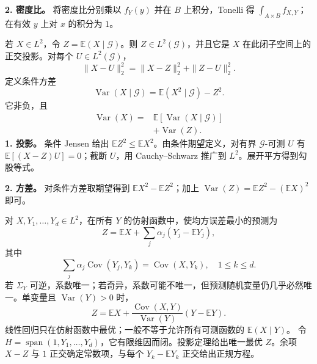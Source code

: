\textbf{2. 密度比。} 将密度比分别乘以 $f_Y(y)$ 并在 $B$ 上积分，Tonelli 得 $\int_{A\times B}f_{X,Y}$；在有效 $y$ 上对 $x$ 的积分为 $1$。

若 $X\in L^2$，令 $Z=\mathbb E(X\mid\mathcal G)$。则 $Z\in L^2(\mathcal G)$，并且它是 $X$ 在此闭子空间上的正交投影。对每个 $U\in L^2(\mathcal G)$，
\[
\|X-U\|_2^2=\|X-Z\|_2^2+\|Z-U\|_2^2.
\]
定义条件方差
\[
\operatorname{Var}(X\mid\mathcal G)
=\mathbb E(X^2\mid\mathcal G)-Z^2.
\]
它非负，且
\[
\begin{aligned}
\operatorname{Var}(X)
={}&\mathbb E[\operatorname{Var}(X\mid\mathcal G)]\\
&+\operatorname{Var}(Z).
\end{aligned}
\]
\textbf{1. 投影。} 条件 Jensen 给出 $\mathbb EZ^2\le\mathbb EX^2$。由条件期望定义，对有界 $\mathcal G$-可测 $U$ 有 $\mathbb E[(X-Z)U]=0$；截断 $U$，用 Cauchy--Schwarz 推广到 $L^2$。展开平方得到勾股等式。

\textbf{2. 方差。} 对条件方差取期望得到 $\mathbb EX^2-\mathbb EZ^2$；加上 $\operatorname{Var}(Z)=\mathbb EZ^2-(\mathbb EX)^2$ 即可。

对 $X,Y_1,\ldots,Y_d\in L^2$，在所有 $Y$ 的仿射函数中，使均方误差最小的预测为
\[
Z=\mathbb EX+\sum_j\alpha_j(Y_j-\mathbb EY_j),
\]
其中
\[
\sum_j\alpha_j\operatorname{Cov}(Y_j,Y_k)
=\operatorname{Cov}(X,Y_k),\quad 1\le k\le d.
\]
若 $\Sigma_Y$ 可逆，系数唯一；若奇异，系数可能不唯一，但预测随机变量仍几乎必然唯一。单变量且 $\operatorname{Var}(Y)>0$ 时，
\[
Z=\mathbb EX+
\frac{\operatorname{Cov}(X,Y)}{\operatorname{Var}(Y)}
(Y-\mathbb EY).
\]
线性回归只在仿射函数中最优；一般不等于允许所有可测函数的 $\mathbb E(X\mid Y)$。
令 $H=\operatorname{span}(1,Y_1,\ldots,Y_d)$，它有限维因而闭。投影定理给出唯一最优 $Z$。余项 $X-Z$ 与 $1$ 正交确定常数项，与每个 $Y_k-\mathbb EY_k$ 正交给出正规方程。

